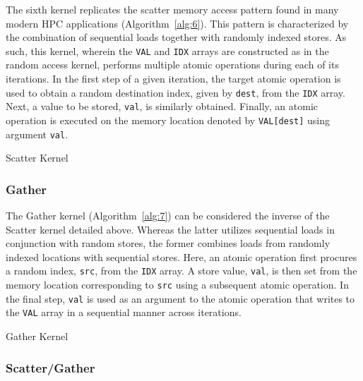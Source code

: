 The sixth kernel replicates the scatter memory access pattern found in many modern HPC applications (Algorithm~\ref{alg:6}).
This pattern is characterized by the combination of sequential loads together with randomly indexed stores.
As such, this kernel, wherein the \texttt{VAL} and \texttt{IDX} arrays are constructed as in the random access kernel, performs multiple atomic operations during each of its iterations.
In the first step of a given iteration, the target atomic operation is used to obtain a random destination index, given by \texttt{dest}, from the \texttt{IDX} array.
Next, a value to be stored, \texttt{val}, is similarly obtained.
Finally, an atomic operation is executed on the memory location denoted by \texttt{VAL[dest]} using argument \texttt{val}.

\begin{algorithm}
\SetAlgoLined
{}
\caption{Scatter Kernel}
\label{alg:6}
\end{algorithm}

\subsubsection{Gather}
\label{subsubsec:gather}

The Gather kernel (Algorithm~\ref{alg:7}) can be considered the inverse of the Scatter kernel detailed above.
Whereas the latter utilizes sequential loads in conjunction with random stores, the former combines loads from randomly indexed locations with sequential stores.
Here, an atomic operation first procures a random index, \texttt{src}, from the \texttt{IDX} array.
A store value, \texttt{val}, is then set from the memory location corresponding to \texttt{src} using a subsequent atomic operation.
In the final step, \texttt{val} is used as an argument to the atomic operation that writes to the \texttt{VAL} array in a sequential manner across iterations. 

\begin{algorithm}
\SetAlgoLined
{}
\caption{Gather Kernel}
\label{alg:7}
\end{algorithm}

\subsubsection{Scatter/Gather}
\label{subsubsec:sg}

